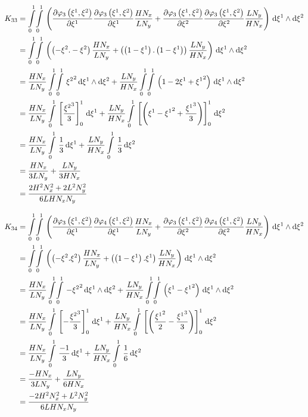 \begin{equation}
  \begin{aligned}
    K_{33}&=\giint{0}{1}{0}{1}{\pbrac{\delby{\lbfn{3}{\xione,\xitwo}}{\xione}\delby{\lbfn{3}{\xione,\xitwo}}{\xione}
        \dfrac{H N_{x}}{L N_{y}}+\delby{\lbfn{3}{\xione,\xitwo}}{\xitwo}\delby{\lbfn{3}{\xione,\xitwo}}{\xitwo}
        \dfrac{L N_{y}}{H N_{x}}}}{\xione}{\xitwo}\\
    &=\giint{0}{1}{0}{1}{\pbrac{\pbrac{-\xitwo.-\xitwo}\dfrac{H N_{x}}{L N_{y}}+
    \pbrac{\pbrac{1-\xione}.\pbrac{1-\xione}}\dfrac{L N_{y}}{H N_{x}}}}{\xione}{\xitwo} \\
    &=\dfrac{H N_{x}}{L N_{y}}\giint{0}{1}{0}{1}{\xitwosq}{\xione}{\xitwo}+
    \dfrac{L N_{y}}{H N_{x}}\giint{0}{1}{0}{1}{\pbrac{1-2\xione+\xionesq}}{\xione}{\xitwo} \\
    &=\dfrac{H N_{x}}{L N_{y}}\gint{0}{1}{\sqbrac{\dfrac{\xitwocube}{3}}_{0}^{1}}{\xione}+
    \dfrac{L N_{y}}{H N_{x}}\gint{0}{1}{\sqbrac{\pbrac{\xione-\xionesq+\dfrac{\xionecube}{3}}}_{0}^{1}}{\xitwo} \\
    &=\dfrac{H N_{x}}{L N_{y}}\gint{0}{1}{\dfrac{1}{3}}{\xione}+\dfrac{L N_{y}}{H N_{x}}\gint{0}{1}{\dfrac{1}{3}}{\xitwo} \\
    &=\dfrac{H N_{x}}{3 L N_{y}}+\dfrac{L N_{y}}{3 H N_{x}} \\
    &=\dfrac{2 H^{2}N_{x}^{2}+2 L^{2}N_{y}^{2}}{6 L H N_{x} N_{y}}
  \end{aligned}
\end{equation}

\begin{equation}
  \begin{aligned}
    K_{34}&=\giint{0}{1}{0}{1}{\pbrac{\delby{\lbfn{3}{\xione,\xitwo}}{\xione}\delby{\lbfn{4}{\xione,\xitwo}}{\xione}
        \dfrac{H N_{x}}{L N_{y}}+\delby{\lbfn{3}{\xione,\xitwo}}{\xitwo}\delby{\lbfn{4}{\xione,\xitwo}}{\xitwo}
        \dfrac{L N_{y}}{H N_{x}}}}{\xione}{\xitwo}\\
    &=\giint{0}{1}{0}{1}{\pbrac{\pbrac{-\xitwo.\xitwo}\dfrac{H N_{x}}{L N_{y}}+
    \pbrac{\pbrac{1-\xione}.\xione}\dfrac{L N_{y}}{H N_{x}}}}{\xione}{\xitwo} \\
    &=\dfrac{H N_{x}}{L N_{y}}\giint{0}{1}{0}{1}{-\xitwosq}{\xione}{\xitwo}+
    \dfrac{L N_{y}}{H N_{x}}\giint{0}{1}{0}{1}{\pbrac{\xione-\xionesq}}{\xione}{\xitwo} \\
    &=\dfrac{H N_{x}}{L N_{y}}\gint{0}{1}{\sqbrac{-\dfrac{\xitwocube}{3}}_{0}^{1}}{\xione}+
    \dfrac{L N_{y}}{H N_{x}}\gint{0}{1}{\sqbrac{\pbrac{\dfrac{\xionesq}{2}-\dfrac{\xionecube}{3}}}_{0}^{1}}{\xitwo} \\
    &=\dfrac{H N_{x}}{L N_{y}}\gint{0}{1}{\dfrac{-1}{3}}{\xione}+\dfrac{L N_{y}}{H N_{x}}\gint{0}{1}{\dfrac{1}{6}}{\xitwo} \\
    &=\dfrac{-H N_{x}}{3 L N_{y}}+\dfrac{L N_{y}}{6 H N_{x}} \\
    &=\dfrac{- 2 H^{2}N_{x}^{2}+L^{2}N_{y}^{2}}{6 L H N_{x} N_{y}}
  \end{aligned}
\end{equation}

